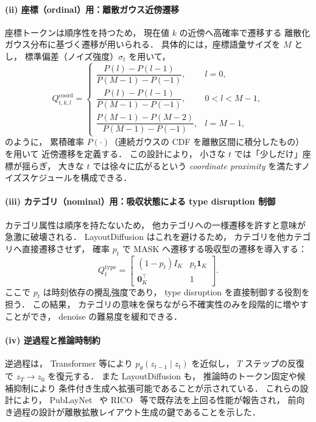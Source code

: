 \documentclass[a4j,12pt,dvipdfmx]{jsreport}
\begin{document}
\paragraph{(ii) 座標（ordinal）用：離散ガウス近傍遷移}
座標トークンは順序性を持つため，
現在値 $k$ の近傍へ高確率で遷移する
離散化ガウス分布に基づく遷移が用いられる．
具体的には，座標語彙サイズを $M$ とし，
標準偏差（ノイズ強度）$\sigma_t$ を用いて，
\begin{equation}
   Q_{t,k,l}^{\mathrm{coord}}
   =
   \begin{cases}
      \dfrac{P(l)-P(l-1)}{P(M-1)-P(-1)},   & l=0,     \\[6pt]
      \dfrac{P(l)-P(l-1)}{P(M-1)-P(-1)},   & 0<l<M-1, \\[6pt]
      \dfrac{P(M-1)-P(M-2)}{P(M-1)-P(-1)}, & l=M-1,
   \end{cases}
   \label{eq:layoutdiffusion_Qcoord}
\end{equation}
のように，
累積確率 $P(\cdot)$（連続ガウスの CDF を離散区間に積分したもの）を用いて
近傍遷移を定義する．
この設計により，
小さな $t$ では「少しだけ」座標が揺らぎ，
大きな $t$ では徐々に広がるという
\textit{coordinate proximity} を満たすノイズスケジュールを構成できる．

\paragraph{(iii) カテゴリ（nominal）用：吸収状態による type disruption 制御}
カテゴリ属性は順序を持たないため，
他カテゴリへの一様遷移を許すと意味が急激に破壊される．
LayoutDiffusion はこれを避けるため，
カテゴリを他カテゴリへ直接遷移させず，
確率 $p_t$ で $\mathrm{MASK}$ へ遷移する吸収型の遷移を導入する：
\begin{equation}
   Q_t^{\mathrm{type}}
   =
   \begin{bmatrix}
      (1-p_t)I_K        & p_t\mathbf{1}_K \\
      \mathbf{0}_K^\top & 1
   \end{bmatrix}.
   \label{eq:layoutdiffusion_Qtype}
\end{equation}
ここで $p_t$ は時刻依存の攪乱強度であり，
type disruption を直接制御する役割を担う．
この結果，
カテゴリの意味を保ちながら不確実性のみを段階的に増やすことができ，
denoise の難易度を緩和できる．

\paragraph{(iv) 逆過程と推論時制約}
逆過程は，
Transformer 等により $p_\theta(z_{t-1}\mid z_t)$ を近似し，
$T$ ステップの反復で $z_T\!\to\!z_0$ を復元する．
また LayoutDiffusion も，
推論時のトークン固定や候補抑制により
条件付き生成へ拡張可能であることが示されている．
これらの設計により，
PubLayNet~\cite{zhong_publaynet_2019} や RICO~\cite{deka_rico_2017} 等で既存法を上回る性能が報告され，
前向き過程の設計が離散拡散レイアウト生成の鍵であることを示した．
\end{document}
